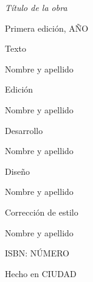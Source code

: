 \documentclass[12pt,a5paper,oneside]{book}
\begin{document}
{\footnotesize
\thispagestyle{empty}

\noindent\textit{Título de la obra}
\vspace{12pt}

\noindent Primera edición, AÑO
\vspace{12pt}

\noindent Texto

\noindent Nombre y apellido
\vspace{12pt}

\noindent Edición

\noindent Nombre y apellido
\vspace{12pt}

\noindent Desarrollo

\noindent Nombre y apellido
\vspace{12pt}

\noindent Diseño

\noindent Nombre y apellido
\vspace{12pt}

\noindent Corrección de estilo

\noindent Nombre y apellido
\vspace{12pt}

\noindent ISBN: NÚMERO
\vspace{12pt}

\noindent Hecho en CIUDAD
\cleardoublepage{}
}

\frontmatter

{\small
\makeatletter
\renewcommand{\l@chapter}{\@dottedtocline{1}{0em}{2em}}
\makeatother
\thispagestyle{empty}
\renewcommand{\contentsname}{Índice}
\tableofcontents
\cleardoublepage{}
}





\mainmatter





\backmatter


\appendix

\end{document}
